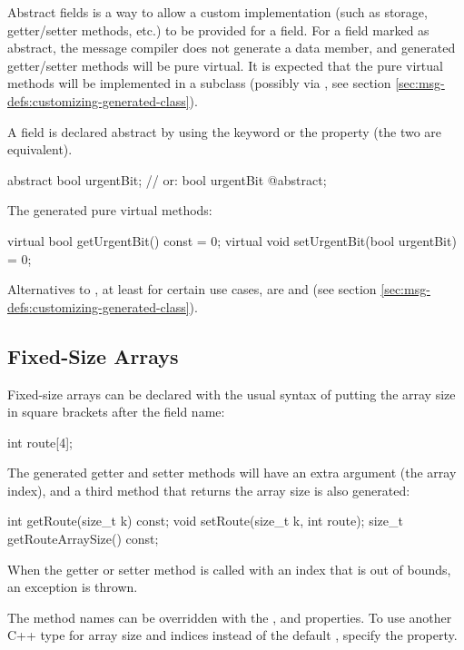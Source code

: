 Abstract fields is a way to allow a custom implementation (such as storage,
getter/setter methods, etc.) to be provided for a field. For a field marked as
abstract, the message compiler does not generate a data member, and generated
getter/setter methods will be pure virtual. It is expected that the pure virtual
methods will be implemented in a subclass (possibly via , see
section \ref{sec:msg-defs:customizing-generated-class}).

A field is declared abstract by using the  keyword or the
 property (the two are equivalent).

\begin{msg}
abstract bool urgentBit; // or: bool urgentBit @abstract;
\end{msg}

The generated pure virtual methods:

\begin{cpp}
virtual bool getUrgentBit() const = 0;
virtual void setUrgentBit(bool urgentBit) = 0;
\end{cpp}

Alternatives to , at least for certain use cases, are
 and  (see section
\ref{sec:msg-defs:customizing-generated-class}).


\subsection{Fixed-Size Arrays}
\label{sec:msg-defs:fixed-size-arrays}

Fixed-size arrays can be declared with the usual syntax of putting the
array size in square brackets after the field name:

\begin{msg}
int route[4];
\end{msg}

The generated getter and setter methods will have an extra  argument (the
array index), and a third method that returns the array size is also generated:

\begin{cpp}
int getRoute(size_t k) const;
void setRoute(size_t k, int route);
size_t getRouteArraySize() const;
\end{cpp}

When the getter or setter method is called with an index that is out of bounds,
an exception is thrown.

The method names can be overridden with the ,  and
 properties. To use another C++ type for array size and
indices instead of the default , specify the 
property.

